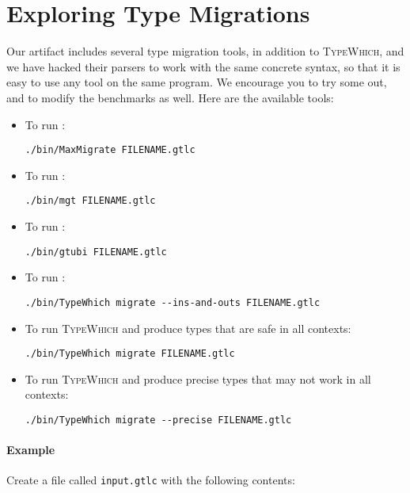 \documentclass{book}
\newcommand{\system}{\textsc{TypeWhich}\xspace}
\begin{document}
\section{Exploring Type Migrations}

Our artifact includes several type migration tools, in addition to \system, and
we have hacked their parsers to work with the same concrete syntax, so that it
is easy to use any tool on the same program. We encourage you to try some out,
and to modify the benchmarks as well. Here are the available tools:

\begin{itemize}

\item To run \citet{migeed:decidable}:
     
\begin{verbatim}
./bin/MaxMigrate FILENAME.gtlc
\end{verbatim}

\item To run \citet{campora:migrating}:

\begin{verbatim}
./bin/mgt FILENAME.gtlc
\end{verbatim}

\item To run \citet{siek:gti}:

\begin{verbatim}
./bin/gtubi FILENAME.gtlc
\end{verbatim}

\item To run \citet{rastogi:gti}:
\begin{verbatim}
./bin/TypeWhich migrate --ins-and-outs FILENAME.gtlc
\end{verbatim}

\item To run \system{} and produce types that are safe in all contexts:
\begin{verbatim}
./bin/TypeWhich migrate FILENAME.gtlc
\end{verbatim}

\item To run \system{} and produce precise types that may not work in all
contexts:
\begin{verbatim}
./bin/TypeWhich migrate --precise FILENAME.gtlc
\end{verbatim}

\end{itemize}

\paragraph{Example}
Create a file called \texttt{input.gtlc} with the following contents:
\end{document}
